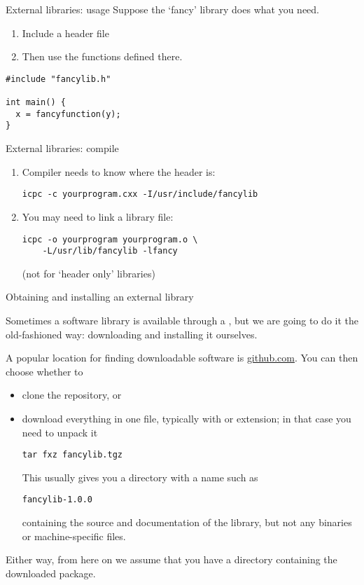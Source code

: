 \begin{slide}{External libraries: usage}
  \label{sl:lib-use}
  Suppose the `fancy' library does what you need.
  \begin{enumerate}
  \item
    Include a header file
  \item Then use the functions defined there.
  \end{enumerate}

\begin{lstlisting}
#include "fancylib.h"

int main() {
  x = fancyfunction(y);
}
\end{lstlisting}
\end{slide}

\begin{slide}{External libraries: compile}
  \label{sl:lib-compile}
  \begin{enumerate}
  \item Compiler needs to know where the header is:
\begin{verbatim}
icpc -c yourprogram.cxx -I/usr/include/fancylib
\end{verbatim}
\item You may need to link a library file:
\begin{verbatim}
icpc -o yourprogram yourprogram.o \
    -L/usr/lib/fancylib -lfancy
\end{verbatim}
(not for `header only' libraries)
  \end{enumerate}
\end{slide}

 {Obtaining and installing an external library}

Sometimes a software library is available through a ,
but we are going to do it the old-fashioned way:
downloading and installing it ourselves.

A popular location for finding downloadable software is \url{github.com}.
You can then choose whether to
\begin{itemize}
\item clone the repository, or
\item download everything in one file, typically with  or  extension;
  in that case you need to unpack it
\begin{verbatim}
tar fxz fancylib.tgz
\end{verbatim}
This usually gives you a directory with a name such as
\begin{verbatim}
fancylib-1.0.0
\end{verbatim}
containing the source and documentation of the library,
but not any binaries or machine-specific files.
\end{itemize}
Either way, from here on we assume that you have a directory containing the downloaded package.

